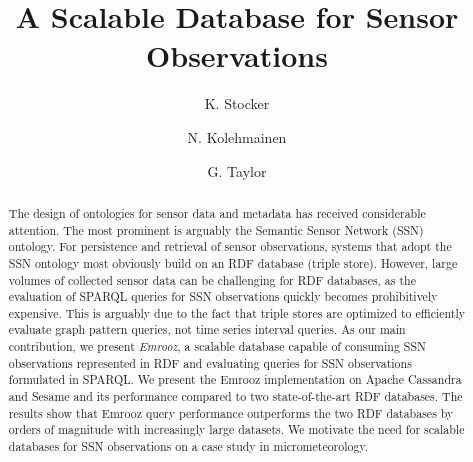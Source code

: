 \documentclass[preprint,12pt,authoryear]{elsarticle}
\begin{document}
\begin{frontmatter}



\title{A Scalable Database for Sensor Observations}


\author[inst1]{K. Stocker}
\author[inst2]{N. Kolehmainen}
\author[inst3]{G. Taylor}
\address[inst1]{Environmental Informatics Research Group, University of Zurich}
\address[inst2]{Biogeochemistry Research Group, Australian National University}
\address[inst3]{College of Engineering and Computer Science, University of Eastern Finland}

\begin{abstract}
The design of ontologies for sensor data and metadata has received considerable attention. The most prominent is arguably the Semantic Sensor Network (SSN) ontology. For persistence and retrieval of sensor observations, systems that adopt the SSN ontology most obviously build on an RDF database (triple store). However, large volumes of collected sensor data can be challenging for RDF databases, as the evaluation of SPARQL queries for SSN observations quickly becomes prohibitively expensive. This is arguably due to the fact that triple stores are optimized to efficiently evaluate graph pattern queries, not time series interval queries. As our main contribution, we present \emph{Emrooz}, a scalable database capable of consuming SSN observations represented in RDF and evaluating queries for SSN observations formulated in SPARQL. We present the Emrooz implementation on Apache Cassandra and Sesame and its performance compared to two state-of-the-art RDF databases. The results show that Emrooz query performance outperforms the two RDF databases by orders of magnitude with increasingly large datasets. We motivate the need for scalable databases for SSN observations on a case study in micrometeorology.
\end{abstract}


\end{frontmatter}
\end{document}
